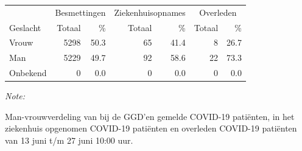 \documentclass[
  english,
  man,floatsintext]{apa6}
\begin{document}
\begin{table}
\centering\begingroup\fontsize{11}{13}\selectfont

\begin{threeparttable}
\begin{tabular}{lrrrrrr}
\toprule
\multicolumn{1}{c}{ } & \multicolumn{2}{c}{Besmettingen} & \multicolumn{2}{c}{Ziekenhuisopnames} & \multicolumn{2}{c}{Overleden} \\
\cmidrule(l{3pt}r{3pt}){2-3} \cmidrule(l{3pt}r{3pt}){4-5} \cmidrule(l{3pt}r{3pt}){6-7}
Geslacht & Totaal & \% & Totaal & \% & Totaal & \%\\
\midrule
Vrouw & 5298 & 50.3 & 65 & 41.4 & 8 & 26.7\\
Man & 5229 & 49.7 & 92 & 58.6 & 22 & 73.3\\
Onbekend & 0 & 0.0 & 0 & 0.0 & 0 & 0.0\\
\bottomrule
\end{tabular}
\begin{tablenotes}
\item \textit{Note: } 
\item Man-vrouwverdeling van bij de GGD’en gemelde COVID-19 patiënten, in het ziekenhuis opgenomen COVID-19 patiënten en overleden COVID-19 patiënten van 13 juni t/m 27 juni 10:00 uur.
\end{tablenotes}
\end{threeparttable}
\endgroup{}
\end{table}
\newpage
\end{document}

